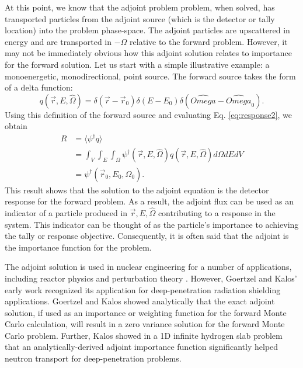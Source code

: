 At this point, we know that the adjoint problem problem, when solved, has
transported particles from the adjoint source (which is the detector or tally
location) into the problem phase-space. The adjoint particles are
upscattered in energy and are transported in $-\Omega$ relative to the forward
problem. However, it may not be immediately obvious how this adjoint solution
relates to importance for the forward solution. Let us start with a simple
illustrative example: a monoenergetic, monodirectional, point source. The
forward source takes the form of a delta function:
\begin{equation*}
  q(\vec{r}, E, \hat{\Omega}) = \delta(\vec{r}-\vec{r}_0) \delta(E-E_0)
  \delta(\hat{Omega}-\hat{Omega}_0) .
\end{equation*}
Using this definition of the forward source and evaluating Eq.
\eqref{eq:response2}, we obtain
\begin{equation*}
  \begin{split}
    R &= \langle \psi^{\dagger} q \rangle \\
    &= \int_{V} \int_{E} \int_{\Omega} \psi^{\dagger}(\vec{r}, E, \hat{\Omega})
       q(\vec{r}, E, \hat{\Omega}) d\Omega dE dV \\
       & = \psi^{\dagger}(\vec{r}_0, E_0, \hat{\Omega}_0).
\end{split}
\end{equation*}
This result shows that the solution to the adjoint equation is the detector
response for the forward problem. As a result, the adjoint flux can be used as
an indicator of a particle produced in $\vec{r}, E, \hat{\Omega}$ contributing
to a response in the system. This indicator can be thought of as the particle's
importance to achieving the tally or response objective. Consequently, it is
often said that the adjoint is the importance function for the problem.

The adjoint solution is used in nuclear engineering for a number of
applications, including reactor physics and perturbation theory
\cite{lewins_importance_1965, lewins_developments_1968,
greenspan_developments_1976, lux_monte_1991}.
However, Goertzel and Kalos' early work recognized its
application for deep-penetration radiation shielding applications.
Goertzel and Kalos \cite{goertzel_monte_1958}
showed analytically
that the exact adjoint solution, if used as an importance or weighting
function for the forward Monte Carlo calculation, will result in a zero variance
solution for the forward Monte Carlo problem. Further, Kalos
\cite{kalos_importance_1963} showed in a 1D infinite hydrogen slab problem that
an analytically-derived adjoint importance function significantly helped neutron
transport for deep-penetration problems.


